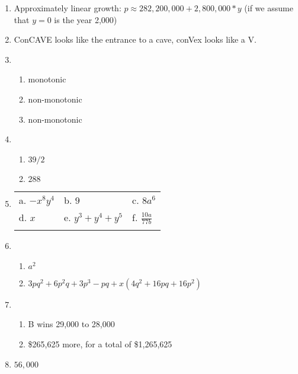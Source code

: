 \documentclass[11pt]{article}
\begin{document}
\begin{enumerate}
\item Approximately linear growth: $p \approx 282,200,000 + 2,800,000*y$ (if we assume that $y = 0$ is the year 2,000)




\item ConCAVE looks like the entrance to a cave, conVex looks like a V.



\item 
\begin{enumerate}
\item monotonic
\item non-monotonic
\item non-monotonic
\end{enumerate}


\item 
\begin{enumerate}
\item $39/2$
\item $288$
\end{enumerate}



\item 
\begin{tabular}{p{3cm}p{3cm}p{3cm}}
a. $-x^8y^4$            &  b. $9$                              & c. $8a^6$                     \rule{0cm}{1cm}\\
d. $x$                  &  e. $y^3 + y^4 + y^5$                & f. $\frac{10a}{77b}$          \rule{0cm}{1cm}\\
\rule{0cm}{1cm}\\ 
\end{tabular}



\item 
\begin{enumerate}
\item $a^2$
\item $3pq^2 + 6p^2 q + 3p^3 - pq + x(4q^2 + 16pq +16p^2)$
\end{enumerate}


\item 
\begin{enumerate}
\item B wins 29,000 to 28,000
\item \$265,625 more, for a total of \$1,265,625
\end{enumerate}


\item $56,000$







\end{enumerate}
\end{document}
